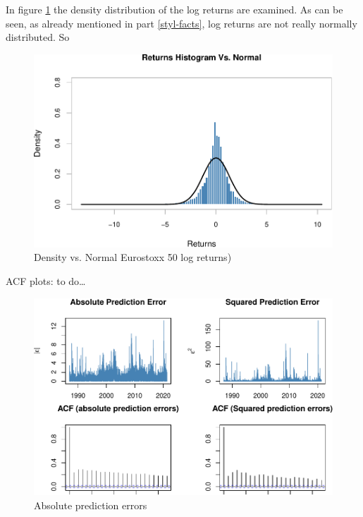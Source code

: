 \documentclass[a4paper, twoside]{templates/ociamthesis}
\begin{document}
\newpage

\noindent In figure \ref{fig:plot4} the density distribution of the log returns are examined. As can be seen, as already mentioned in part \ref{styl-facts}, log returns are not really normally distributed. So

\begin{figure}

{\centering \includegraphics[width=0.75\linewidth]{_main_files/figure-latex/plot4-1} 

}

\caption{Density vs. Normal Eurostoxx 50 log returns)}\label{fig:plot4}
\end{figure}

\newpage

\noindent ACF plots: to do\ldots{}

\begin{figure}[h]

{\centering \includegraphics[width=1\linewidth]{_main_files/figure-latex/acfplots-1} 

}

\caption{Absolute prediction errors}\label{fig:acfplots}
\end{figure}
\end{document}
